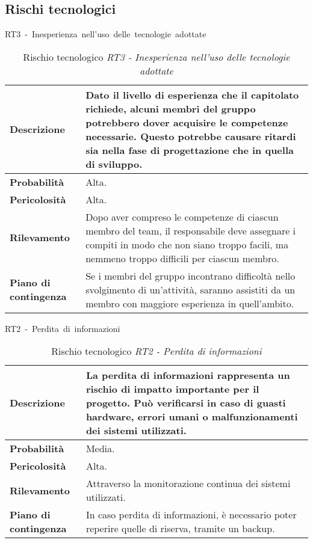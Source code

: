 

\begin{table}[!h]
    \subsection{Rischi tecnologici}
    \centering
    \hbox{RT3 - Inesperienza nell'uso delle tecnologie adottate}
    \vspace{0.3cm}
	\begin{tabular}{|l|p{10cm}|} 
		\hline
		\textbf{Descrizione} & Dato il livello di esperienza che il capitolato richiede,  alcuni membri del gruppo potrebbero dover acquisire le competenze necessarie. Questo potrebbe causare ritardi sia nella fase di progettazione che in quella di sviluppo.  \\ 

        \hline
        \textbf{Probabilità} & Alta. \\
        \hline
        \textbf{Pericolosità} & Alta. \\
        \hline
        \textbf{Rilevamento} & Dopo aver compreso le competenze di ciascun membro del team, il responsabile deve assegnare i compiti in modo che non siano troppo facili, ma nemmeno troppo difficili per ciascun membro. \\
        \hline
        \textbf{Piano di contingenza} & Se i membri del gruppo incontrano difficoltà nello svolgimento di un'attività, saranno assistiti da un membro con maggiore esperienza in quell'ambito. \\
		\hline
	\end{tabular}
    \caption{Rischio tecnologico \textit{RT3 - Inesperienza nell'uso delle tecnologie adottate}}
    \label{table:5}
\end{table}

\begin{table}[!h]
    \centering
    \hbox{RT2 - Perdita di informazioni}
    \vspace{0.3cm}
	\begin{tabular}{|l|p{10cm}|} 
		\hline
		\textbf{Descrizione} & La perdita di informazioni rappresenta un rischio di impatto importante per il progetto. Può verificarsi in caso di guasti hardware, errori umani o malfunzionamenti dei sistemi utilizzati. \\ 
        \hline
        \textbf{Probabilità} & Media. \\
        \hline
        \textbf{Pericolosità} & Alta. \\
        \hline
        \textbf{Rilevamento} & Attraverso la monitorazione continua dei sistemi utilizzati. \\
        \hline
        \textbf{Piano di contingenza} & In caso perdita di informazioni, è necessario poter reperire quelle di riserva, tramite un backup. \\
		\hline
	\end{tabular}
    \caption{Rischio tecnologico \textit{RT2 - Perdita di informazioni}}
    \label{table:6}
\end{table}

